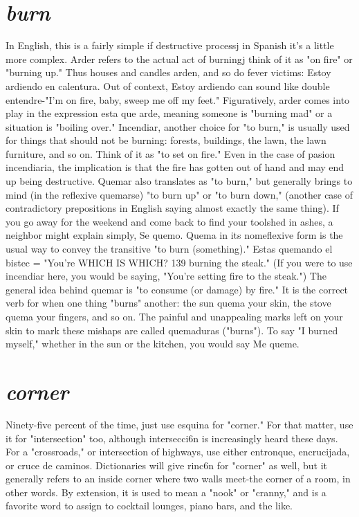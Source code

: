 \section{\emph{burn}}

In English, this is a fairly simple if destructive processj in
Spanish it's a little more complex. Arder refers to the actual act of
burningj think of it as "on fire" or "burning up." Thus houses and
candles arden, and so do fever victims: Estoy ardiendo en calentura.
Out of context, Estoy ardiendo can sound like double entendre-"I'm
on fire, baby, sweep me off my feet." Figuratively, arder comes into
play in the expression esta que arde, meaning someone is "burning
mad" or a situation is "boiling over."
Incendiar, another choice for "to burn," is usually used for
things that should not be burning: forests, buildings, the lawn, the
lawn furniture, and so on. Think of it as "to set on fire." Even in the
case of pasion incendiaria, the implication is that the fire has gotten
out of hand and may end up being destructive.
Quemar also translates as "to burn," but generally brings to
mind (in the reflexive quemarse) "to burn up" or "to burn down," (another case of contradictory prepositions in English saying almost exactly the same thing). If you go away for the weekend and come back
to find your toolshed in ashes, a neighbor might explain simply, Se
quemo. Quema in its nomeflexive form is the usual way to convey the
transitive "to burn (something)." Estas quemando el bistec = "You're
WHICH IS WHICH? 139
burning the steak." (If you were to use incendiar here, you would be
saying, "You're setting fire to the steak.") The general idea behind quemar is "to consume (or damage) by fire." It is the correct verb for when
one thing "burns" another: the sun quema your skin, the stove quema
your fingers, and so on. The painful and unappealing marks left on
your skin to mark these mishaps are called quemaduras ("burns"). To
say "I burned myself," whether in the sun or the kitchen, you would
say Me queme.

\section{\emph{corner}}

Ninety-five percent of the time, just use esquina for "corner."
For that matter, use it for "intersection" too, although intersecci6n
is increasingly heard these days. For a "crossroads," or intersection
of highways, use either entronque, encrucijada, or cruce de caminos.
Dictionaries will give rinc6n for "corner" as well, but it generally refers to an inside corner where two walls meet-the corner of a room,
in other words. By extension, it is used to mean a "nook" or "cranny,"
and is a favorite word to assign to cocktail lounges, piano bars, and
the like.


